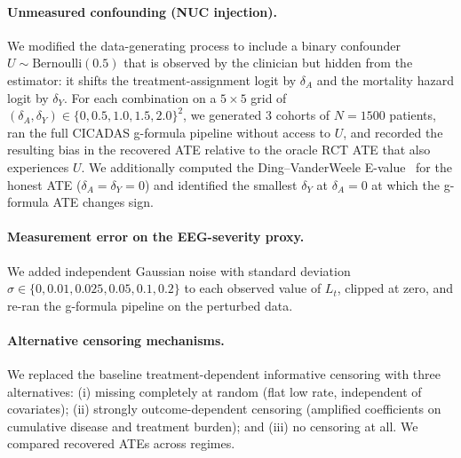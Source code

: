\paragraph{Unmeasured confounding (NUC injection).}
We modified the data-generating process to include a binary confounder
\(U \sim \mathrm{Bernoulli}(0.5)\) that is observed by the clinician but hidden from the
estimator: it shifts the treatment-assignment logit by \(\delta_A\) and the mortality
hazard logit by \(\delta_Y\). For each combination on a \(5 \times 5\) grid of
\((\delta_A, \delta_Y) \in \{0, 0.5, 1.0, 1.5, 2.0\}^2\), we generated 3 cohorts of
\(N = 1500\) patients, ran the full CICADAS g-formula pipeline without access to \(U\),
and recorded the resulting bias in the recovered ATE relative to the oracle RCT ATE that
also experiences \(U\). We additionally computed the Ding--VanderWeele E-value~\cite{vanderweele2017evalue} for the
honest ATE (\(\delta_A = \delta_Y = 0\)) and identified the smallest \(\delta_Y\) at
\(\delta_A = 0\) at which the g-formula ATE changes sign.

\paragraph{Measurement error on the EEG-severity proxy.}
We added independent Gaussian noise with standard deviation \(\sigma \in
\{0, 0.01, 0.025, 0.05, 0.1, 0.2\}\) to each observed value of \(L_t\), clipped at zero,
and re-ran the g-formula pipeline on the perturbed data.

\paragraph{Alternative censoring mechanisms.}
We replaced the baseline treatment-dependent informative censoring with three alternatives:
(i) missing completely at random (flat low rate, independent of covariates);
(ii) strongly outcome-dependent censoring (amplified coefficients on cumulative disease
and treatment burden); and (iii) no censoring at all. We compared recovered ATEs across
regimes.

